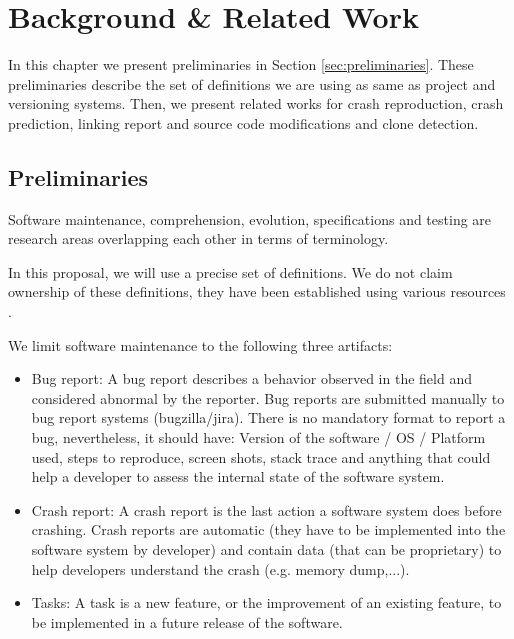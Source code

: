 
\chapter{Background \& Related Work\label{chap:relwork}}

In this chapter we present preliminaries in Section \ref{sec:preliminaries}.
These preliminaries describe the set of definitions we are using as same as project and versioning systems.
Then, we present related works for crash reproduction, crash prediction, linking report and source code modifications and clone detection.

\section{Preliminaries\label{sec:preliminaries}}

Software maintenance, comprehension, evolution, specifications and testing are research areas overlapping each other in terms of terminology.

In this proposal, we will use a precise set of definitions.
We do not claim ownership of these definitions, they have been established using various resources \cite{Avizienis2004,Pratt2001,Burnstein2006,Radatz1990,Whittaker2012}.

We limit software maintenance to the following three artifacts:

\begin{itemize}
	\item Bug report: A bug report describes a behavior observed in the field and considered abnormal by the reporter. Bug reports are submitted manually to bug report systems (bugzilla/jira). There is no mandatory format to report a bug, nevertheless, it should have: Version of the software / OS / Platform used, steps to reproduce, screen shots, stack trace and anything that could help a developer to assess the internal state of the software system.
	\item Crash report: A crash report is the last action a software system does before crashing. Crash reports are automatic (they have to be implemented into the software system by developer) and contain data (that can be proprietary) to help developers understand the crash (e.g. memory dump,...).
	\item Tasks: A task is a new feature, or the improvement of an existing feature, to be implemented in a future release of the software.
\end{itemize}

